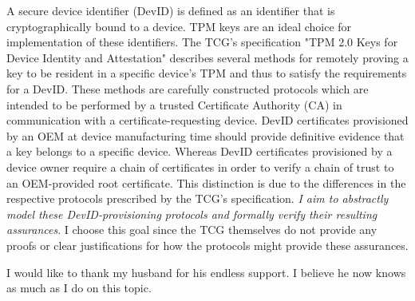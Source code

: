 \begin{abstractlong}


A secure device identifier (DevID) is defined as an identifier that is cryptographically bound to a device. TPM keys are an ideal choice for implementation of these identifiers.
The TCG's specification "TPM 2.0 Keys for Device Identity and Attestation" describes several methods for remotely proving a key to be resident in a specific device's TPM and thus to satisfy the requirements for a DevID. These methods are carefully constructed protocols which are intended to be performed by a trusted Certificate Authority (CA) in communication with a certificate-requesting device. DevID certificates provisioned by an OEM at device manufacturing time should provide definitive evidence that a key belongs to a specific device. Whereas DevID certificates provisioned by a device owner require a chain of certificates in order to verify a chain of trust to an OEM-provided root certificate. This distinction is due to the differences in the respective protocols prescribed by the TCG's specification. \textit{I aim to abstractly model these DevID-provisioning protocols and formally verify their resulting assurances}. I choose this goal since the TCG themselves do not provide any proofs or clear justifications for how the protocols might provide these assurances. 
\end{abstractlong}




\begin{acknowledgementslong}
I would like to thank my husband for his endless support. I believe he now knows as much as I do on this topic.
\end{acknowledgementslong}

